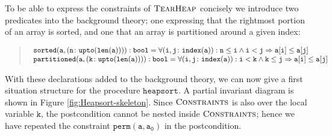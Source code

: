 \documentclass[english,submission]{eptcs}
\begin{document}
To be able to express the constraints of $\textsc{TearHeap}$ concisely
we introduce two predicates into the background theory; one expressing
that the rightmost portion of an array is sorted, and one that an
array is partitioned around a given index:
\begin{quote}
$\begin{array}[t]{l}
\mathtt{sorted(a,(n \colon  upto(len(a)))):bool=\forall(i,j \colon index(a)):n\le i\land i<j\Rightarrow a[i]\le a[j]}\\
\mathtt{partitioned(a,(k \colon upto(len(a)))):bool=\forall(i,j \colon index(a)):i<k\land k\le j\Rightarrow a[i]\le a[j]}
\end{array}$
\end{quote}
\noindent With these declarations added to the background theory,
we can now give a first situation structure for the procedure $\mathtt{heapsort}$.
A partial invariant diagram is shown in Figure \ref{fig:Heapsort-skeleton}.
Since $\textsc{Constraints}$ is also over the local variable $\mathtt{k}$,
the postcondition cannot be nested inside $\textsc{Constraints}$;
hence we have repeated the constraint $\mathtt{perm(a,a_{0})}$ in
the postcondition.
\end{document}

